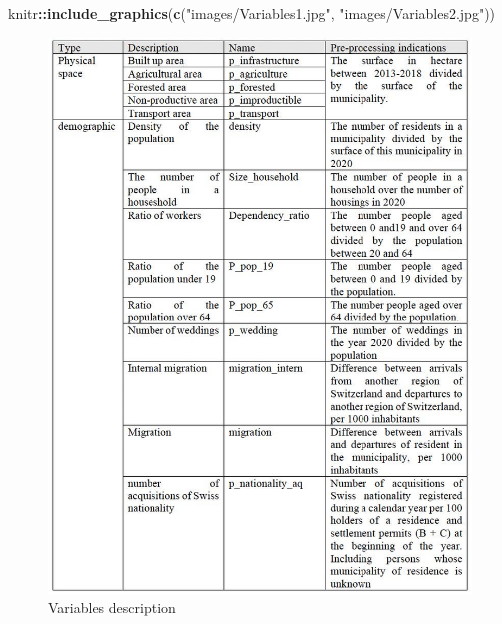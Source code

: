 \documentclass[
]{book}
\newenvironment{Shaded}{\begin{snugshade}}{\end{snugshade}}
\newcommand{\FunctionTok}[1]{\textcolor[rgb]{0.13,0.29,0.53}{\textbf{#1}}}
\newcommand{\NormalTok}[1]{#1}
\newcommand{\SpecialCharTok}[1]{\textcolor[rgb]{0.81,0.36,0.00}{\textbf{#1}}}
\newcommand{\StringTok}[1]{\textcolor[rgb]{0.31,0.60,0.02}{#1}}
\begin{document}
\begin{Shaded}
\begin{Highlighting}[]
\NormalTok{knitr}\SpecialCharTok{::}\FunctionTok{include\_graphics}\NormalTok{(}\FunctionTok{c}\NormalTok{(}\StringTok{"images/Variables1.jpg"}\NormalTok{, }\StringTok{"images/Variables2.jpg"}\NormalTok{))}
\end{Highlighting}
\end{Shaded}

\begin{figure}
\includegraphics[width=1\linewidth,height=1\textheight]{images/Variables1} \caption{Variables description \label{Variables}}\label{fig:variables-1}
\end{figure}
\end{document}
